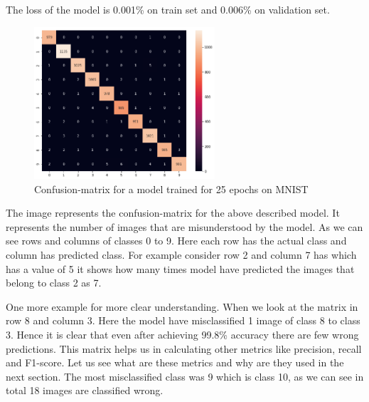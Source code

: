 \noindent The loss of the model is 0.001\% on train set and 0.006\% on validation set.

\begin{figure}[h]
    \centering
    \includegraphics[width=0.6\textwidth]{thesis_template/images/confmatrix.png}
    \caption{\small Confusion-matrix for a model trained for 25 epochs on MNIST}
    \label{}
    \end{figure}

\noindent The image represents the confusion-matrix for the above described model. It represents the number of images that are misunderstood by the model. As we can see rows and columns of classes 0 to 9. Here each row has the actual class and column has predicted class. For example consider row 2 and column 7 has which has a value of 5 it shows how many times model have predicted the images that belong to class 2 as 7.

 One more example for more clear understanding. When we look at the matrix in row 8 and column 3. Here the model have misclassified 1 image of class 8 to class 3. Hence it is clear that even after achieving 99.8\% accuracy there are few wrong predictions. This matrix helps us in calculating other metrics like precision, recall and F1-score. Let us see what are these metrics and why are they used in the next section. The most misclassified class was 9 which is class 10, as we can see in total 18 images are classified wrong.
 
